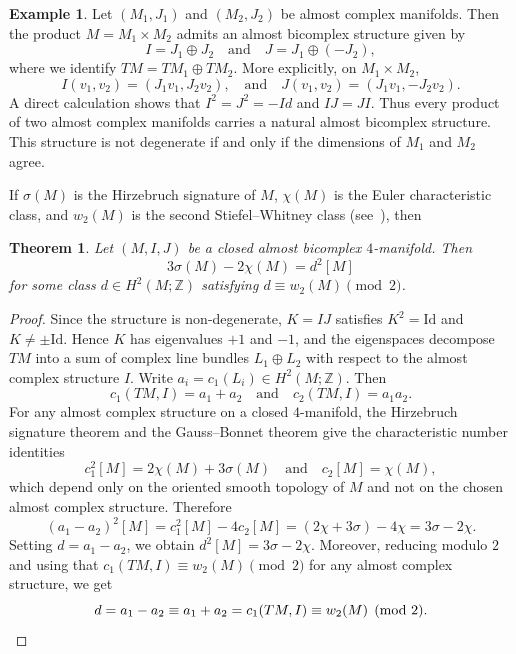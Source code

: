 \documentclass[11pt]{amsart}
\newcommand{\Z}{\mathbb{Z}}
\newtheorem{thm}[prop]{Theorem}
\theoremstyle{definition}
\newtheorem{example}[prop]{Example}       %
\begin{document}
\begin{example}\label{ex:product_complex}
    Let $(M_1, J_1)$ and $(M_2, J_2)$ be almost complex manifolds. Then the product $M = M_1 \times M_2$ admits an almost bicomplex structure given by
    \begin{equation*}
        I = J_1 \oplus J_2 \quad \text{and}\quad J = J_1 \oplus (-J_2),
    \end{equation*}
    where we identify $TM = TM_1 \oplus TM_2$. More explicitly, on $M_1 \times M_2$,
    \begin{equation*}
        I(v_1, v_2) = (J_1 v_1, J_2 v_2), \quad\text{and}\quad J(v_1, v_2) = (J_1 v_1, -J_2 v_2).
    \end{equation*}
    A direct calculation shows that $I^2 = J^2 = -Id$ and $IJ = JI$. Thus every product of two almost complex manifolds carries a natural almost bicomplex structure. This structure is not degenerate if and only if the dimensions of $M_1$ and $M_2$ agree.
\end{example}
If $\sigma(M)$ is the Hirzebruch signature of $M$, $\chi(M)$ is the Euler characteristic class, and $w_2(M)$ is the second Stiefel--Whitney class (see~\cite{Milnor1968}), then
\begin{thm}\label{thm:4d_obstruction}
Let $(M,I,J)$ be a closed almost bicomplex $4$-manifold. Then
\begin{equation*}
3\sigma(M)-2\chi(M)=d^{2}[M]
\end{equation*}
for some class $d\in H^{2}(M;\Z)$ satisfying $d\equiv w_{2}(M)\pmod{2}$.
\end{thm}

\begin{proof}
Since the structure is non-degenerate, $K=IJ$ satisfies $K^{2}=\mathrm{Id}$ and $K\neq\pm\mathrm{Id}$. Hence $K$ has eigenvalues $+1$ and $-1$, and the eigenspaces decompose $TM$ into a sum of complex line bundles $L_{1}\oplus L_{2}$ with respect to the almost complex structure $I$. Write $a_{i}=c_{1}(L_{i})\in H^{2}(M;\Z)$. Then
\begin{equation*}
c_{1}(TM,I)=a_{1}+a_{2}\quad \text{and}\quad c_{2}(TM,I)=a_{1}a_{2}.
\end{equation*}
For any almost complex structure on a closed $4$-manifold, the Hirzebruch signature theorem and the Gauss--Bonnet theorem give the characteristic number identities
\begin{equation*}
c_{1}^{2}[M]=2\chi(M)+3\sigma(M)\quad\text{and}\quad c_{2}[M]=\chi(M),
\end{equation*}
which depend only on the oriented smooth topology of $M$ and not on the chosen almost complex structure. Therefore
\begin{equation*}
(a_{1}-a_{2})^{2}[M]=c_{1}^{2}[M]-4c_{2}[M]=(2\chi+3\sigma)-4\chi=3\sigma-2\chi.
\end{equation*}
Setting $d=a_{1}-a_{2}$, we obtain $d^{2}[M]=3\sigma-2\chi$. Moreover, reducing modulo $2$ and using that $c_{1}(TM,I)\equiv w_{2}(M)\pmod{2}$ for any almost complex structure, we get
\begin{equation*}
d=a_{1}-a_{2}\equiv a_{1}+a_{2}=c_{1}(TM,I)\equiv w_{2}(M)\pmod{2}.\qedhere
\end{equation*}
\end{proof}
\end{document}
